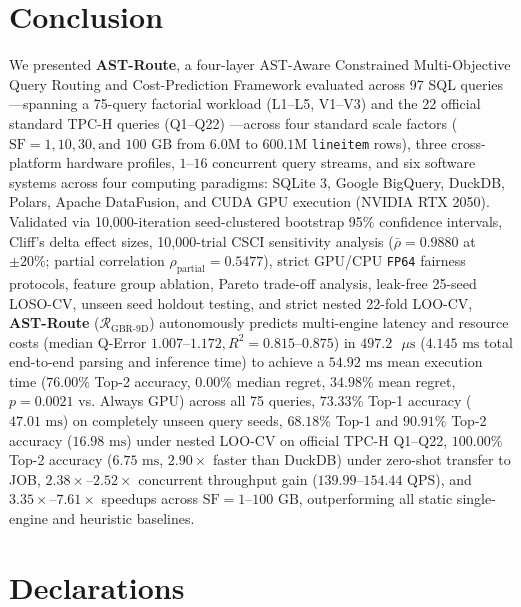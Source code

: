 \documentclass[10pt,a4paper]{article}
\begin{document}
\section{Conclusion}
We presented \textbf{AST-Route}, a four-layer AST-Aware Constrained Multi-Objective Query Routing and Cost-Prediction Framework evaluated across 97 SQL queries---spanning a 75-query factorial workload (L1--L5, V1--V3) and the 22 official standard TPC-H queries (Q1--Q22) \cite{tpc2022tpch}---across four standard scale factors ($\text{SF}=1, 10, 30, \text{and } 100\text{ GB}$ from $6.0\text{M}$ to $600.1\text{M}$ \texttt{lineitem} rows), three cross-platform hardware profiles, $1\text{--}16$ concurrent query streams, and six software systems across four computing paradigms: SQLite 3, Google BigQuery, DuckDB, Polars, Apache DataFusion, and CUDA GPU execution (NVIDIA RTX 2050). Validated via 10,000-iteration seed-clustered bootstrap 95\% confidence intervals, Cliff's delta effect sizes, 10,000-trial CSCI sensitivity analysis ($\bar{\rho}=0.9880$ at $\pm 20\%$; partial correlation $\rho_{\text{partial}}=0.5477$), strict GPU/CPU \texttt{FP64} fairness protocols, feature group ablation, Pareto trade-off analysis, leak-free 25-seed LOSO-CV, unseen seed holdout testing, and strict nested 22-fold LOO-CV, \textbf{AST-Route} ($\mathcal{R}_{\text{GBR-9D}}$) autonomously predicts multi-engine latency and resource costs (median Q-Error $1.007\text{--}1.172, R^2 = 0.815\text{--}0.875$) in $497.2\text{ }\mu\text{s}$ ($4.145\text{ ms}$ total end-to-end parsing and inference time) to achieve a $54.92\text{ ms}$ mean execution time ($76.00\%$ Top-2 accuracy, $0.00\%$ median regret, $34.98\%$ mean regret, $p=0.0021$ vs. Always GPU) across all 75 queries, $73.33\%$ Top-1 accuracy ($47.01\text{ ms}$) on completely unseen query seeds, $68.18\%$ Top-1 and $90.91\%$ Top-2 accuracy ($16.98\text{ ms}$) under nested LOO-CV on official TPC-H Q1--Q22, $100.00\%$ Top-2 accuracy ($6.75\text{ ms}$, $2.90\times$ faster than DuckDB) under zero-shot transfer to JOB, $2.38\times\text{--}2.52\times$ concurrent throughput gain ($139.99\text{--}154.44\text{ QPS}$), and $3.35\times\text{--}7.61\times$ speedups across $\text{SF}=1\text{--}100\text{ GB}$, outperforming all static single-engine and heuristic baselines.

\section*{Declarations}
\end{document}
